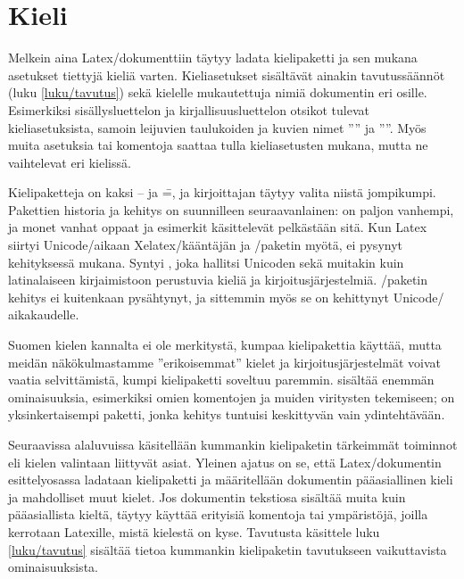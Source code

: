 \section{Kieli}
\label{luku/kieliasetukset}

Melkein aina Latex\-/dokumenttiin täytyy ladata kielipaketti ja sen
mukana asetukset tiettyjä kieliä varten. Kieliasetukset sisältävät
ainakin tavutussäännöt (luku \ref{luku/tavutus}) sekä kielelle
mukautettuja nimiä dokumentin eri osille. Esimerkiksi sisällysluettelon
ja kirjallisuusluettelon otsikot tulevat kieliasetuksista, samoin
leijuvien taulukoiden ja kuvien nimet ''\tablename'' ja ''\figurename''.
Myös muita asetuksia tai komentoja saattaa tulla kieliasetusten mukana,
mutta ne vaihtelevat eri kielissä.

Kielipaketteja on kaksi --  ja  \==,
ja kirjoittajan täytyy valita niistä jompikumpi. Pakettien historia ja
kehitys on suunnilleen seuraavanlainen:  on paljon
vanhempi, ja monet vanhat oppaat ja esimerkit käsittelevät pelkästään
sitä. Kun Latex siirtyi Unicode\-/aikaan Xelatex\-/kääntäjän ja
\-/paketin myötä,  ei pysynyt
kehityksessä mukana. Syntyi , joka hallitsi
Unicoden sekä muitakin kuin latinalaiseen kirjaimistoon perustuvia
kieliä ja kirjoitusjärjestelmiä. \-/paketin kehitys ei
kuitenkaan pysähtynyt, ja sittemmin myös se on kehittynyt Unicode\-/
aikakaudelle.

Suomen kielen kannalta ei ole merkitystä, kumpaa kielipakettia käyttää,
mutta meidän näkökulmastamme ''erikoisemmat'' kielet ja
kirjoitusjärjestelmät voivat vaatia selvittämistä, kumpi kielipaketti
soveltuu paremmin.  sisältää enemmän ominaisuuksia,
esimerkiksi omien komentojen ja muiden viritysten tekemiseen;
 on yksinkertaisempi paketti, jonka kehitys
tuntuisi keskittyvän vain ydintehtävään.

Seuraavissa alaluvuissa käsitellään kummankin kielipaketin tärkeimmät
toiminnot eli kielen valintaan liittyvät asiat. Yleinen ajatus on se,
että Latex\-/dokumentin esittelyosassa ladataan kielipaketti ja
määritellään dokumentin pääasiallinen kieli ja mahdolliset muut kielet.
Jos dokumentin tekstiosa sisältää muita kuin pääasiallista kieltä,
täytyy käyttää erityisiä komentoja tai ympäristöjä, joilla kerrotaan
Latexille, mistä kielestä on kyse. Tavutusta käsittele luku
\ref{luku/tavutus} sisältää tietoa kummankin kielipaketin tavutukseen
vaikuttavista ominaisuuksista.

